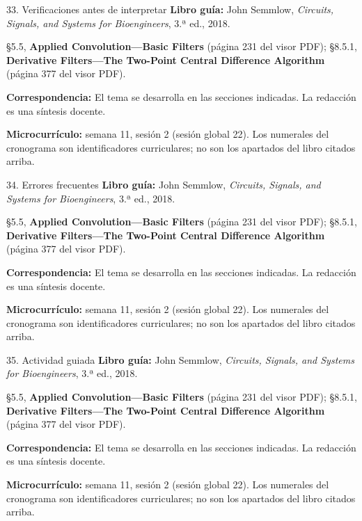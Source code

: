\documentclass[
  10pt,
  ignorenonframetext,
  aspectratio=169,
  spanish,
]{beamer}
\begin{document}
\begin{frame}{33. Verificaciones antes de interpretar}
\label{verificaciones-antes-de-interpretar-1}
\textbf{Libro guía:} John Semmlow, \emph{Circuits, Signals, and Systems
for Bioengineers}, 3.ª ed., 2018.

§5.5, \textbf{Applied Convolution---Basic Filters} (página 231 del visor
PDF); §8.5.1, \textbf{Derivative Filters---The Two-Point Central
Difference Algorithm} (página 377 del visor PDF).

\textbf{Correspondencia:} El tema se desarrolla en las secciones
indicadas. La redacción es una síntesis docente.

\textbf{Microcurrículo:} semana 11, sesión 2 (sesión global 22). Los
numerales del cronograma son identificadores curriculares; no son los
apartados del libro citados arriba.
\end{frame}

\begin{frame}{34. Errores frecuentes}
\label{errores-frecuentes-1}
\textbf{Libro guía:} John Semmlow, \emph{Circuits, Signals, and Systems
for Bioengineers}, 3.ª ed., 2018.

§5.5, \textbf{Applied Convolution---Basic Filters} (página 231 del visor
PDF); §8.5.1, \textbf{Derivative Filters---The Two-Point Central
Difference Algorithm} (página 377 del visor PDF).

\textbf{Correspondencia:} El tema se desarrolla en las secciones
indicadas. La redacción es una síntesis docente.

\textbf{Microcurrículo:} semana 11, sesión 2 (sesión global 22). Los
numerales del cronograma son identificadores curriculares; no son los
apartados del libro citados arriba.
\end{frame}

\begin{frame}{35. Actividad guiada}
\label{actividad-guiada-1}
\textbf{Libro guía:} John Semmlow, \emph{Circuits, Signals, and Systems
for Bioengineers}, 3.ª ed., 2018.

§5.5, \textbf{Applied Convolution---Basic Filters} (página 231 del visor
PDF); §8.5.1, \textbf{Derivative Filters---The Two-Point Central
Difference Algorithm} (página 377 del visor PDF).

\textbf{Correspondencia:} El tema se desarrolla en las secciones
indicadas. La redacción es una síntesis docente.

\textbf{Microcurrículo:} semana 11, sesión 2 (sesión global 22). Los
numerales del cronograma son identificadores curriculares; no son los
apartados del libro citados arriba.
\end{frame}
\end{document}
